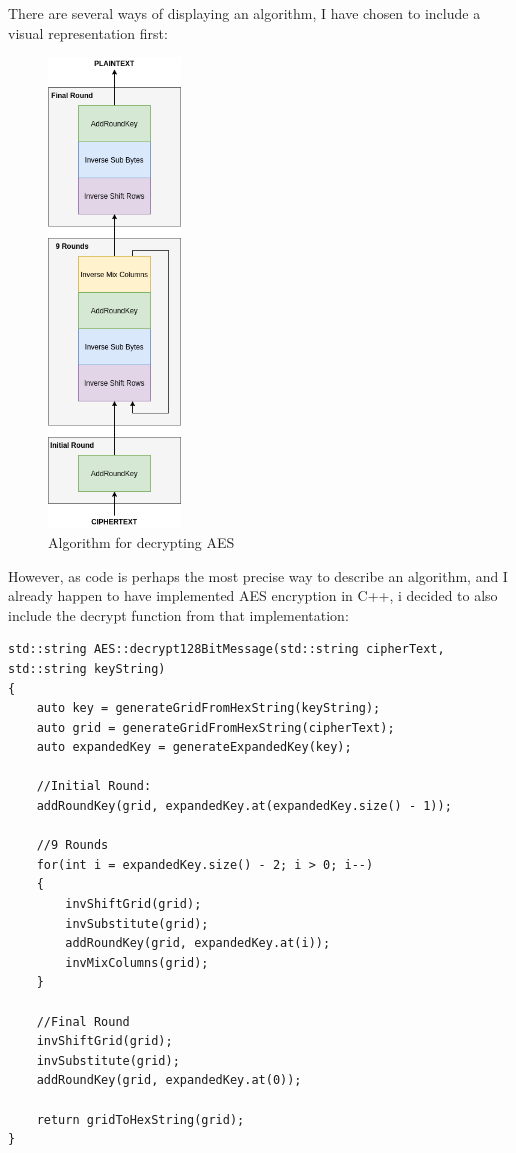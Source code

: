 \documentclass{article}
\begin{document}
There are several ways of displaying an algorithm, I have chosen to include a visual representation first:
\begin{figure}[H]
 \centering
  \includegraphics[width=100pt]{img/decryptAES.png}
 \caption{Algorithm for decrypting AES}
 \end{figure}


However, as code is perhaps the most precise way to describe an algorithm, and I already happen to have implemented AES encryption in C++, i decided to also include the decrypt function from that implementation: 

\begin{lstlisting}
std::string AES::decrypt128BitMessage(std::string cipherText, std::string keyString)
{
	auto key = generateGridFromHexString(keyString);
	auto grid = generateGridFromHexString(cipherText);
	auto expandedKey = generateExpandedKey(key);

	//Initial Round:
	addRoundKey(grid, expandedKey.at(expandedKey.size() - 1));

	//9 Rounds
	for(int i = expandedKey.size() - 2; i > 0; i--)
	{
		invShiftGrid(grid);
		invSubstitute(grid);
		addRoundKey(grid, expandedKey.at(i));
		invMixColumns(grid);
	}

	//Final Round
	invShiftGrid(grid);
	invSubstitute(grid);
	addRoundKey(grid, expandedKey.at(0));

	return gridToHexString(grid);
}
\end{lstlisting}
\end{document}
